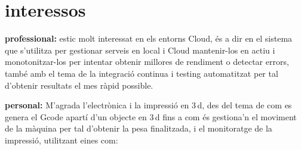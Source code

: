 \documentclass[]{cv-style}          %
\begin{document}




\section{interessos}
  \vspace{-0.2cm}

\textbf{professional:} estic molt interessat en els entorns Cloud, és a dir en el sistema que s'utilitza per gestionar serveis en local i Cloud mantenir-los en actiu i monotonitzar-los per intentar obtenir millores de rendiment o detectar errors, també amb el tema de la integració continua i testing automatitzat per tal d'obtenir resultats el mes ràpid possible. \smallskip

\textbf{personal:} M'agrada l'electrònica i la impressió en 3 d, des del tema de com es genera el Gcode apartí d'un objecte en 3 d fins a com és gestiona'n el moviment de la màquina per tal d'obtenir la pesa finalitzada, i el monitoratge de la impressió, utilitzant eines com:
\end{document}
